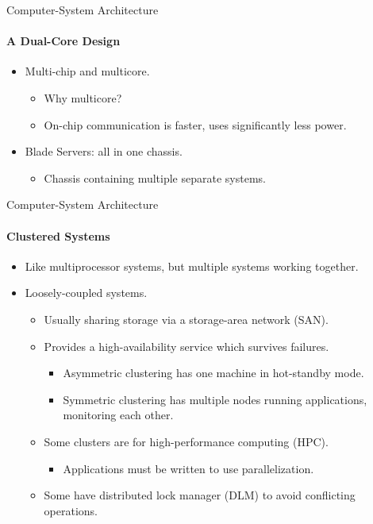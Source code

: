 \documentclass[10pt]{beamer}
\begin{document}
\begin{frame}{Computer-System Architecture}
\framesubtitle{A Dual-Core Design}
\begin{itemize}
\item Multi-chip and \alert{multicore}.
\begin{itemize}
\item Why multicore?
\item On-chip communication is faster, uses significantly less power.
\end{itemize}
\item Blade Servers: all in one chassis.
\begin{itemize}
\item Chassis containing multiple separate systems.
\end{itemize}
\end{itemize}
\end{frame}

\begin{frame}{Computer-System Architecture}
\framesubtitle{Clustered Systems}
\begin{itemize}
\item Like multiprocessor systems, but multiple systems working together.
\item \alert{Loosely-coupled systems}.
\begin{itemize}
\item Usually sharing storage via a storage-area network (SAN).
\item Provides a \alert{high-availability} service which survives failures.
\begin{itemize}
\item Asymmetric clustering has one machine in hot-standby mode.
\item Symmetric clustering has multiple nodes running applications, monitoring each other.
\end{itemize}
\item Some clusters are for \alert{high-performance} computing (HPC).
\begin{itemize}
\item Applications must be written to use parallelization.
\end{itemize}
\item Some have distributed lock manager (DLM) to avoid conflicting operations.
\end{itemize}
\end{itemize}
\end{frame}
\end{document}
